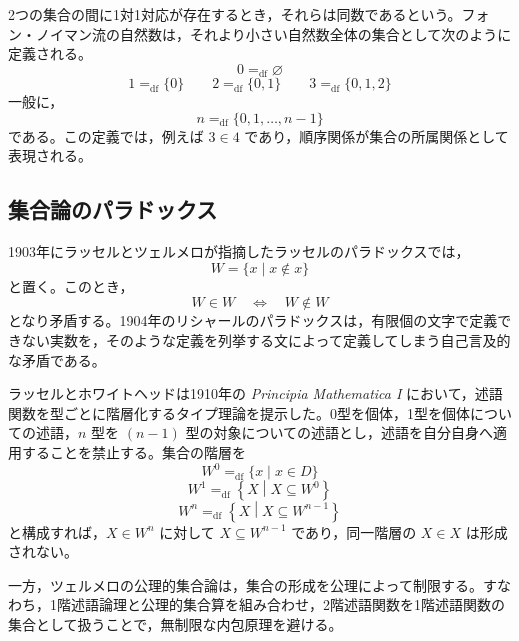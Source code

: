 \documentclass[../main.tex]{subfiles}
\begin{document}
2つの集合の間に1対1対応が存在するとき，それらは同数であるという。フォン・ノイマン流の自然数は，それより小さい自然数全体の集合として次のように定義される。
\[
  0 =_{\mathrm{df}} \varnothing
\]
\[
  1 =_{\mathrm{df}} \{0\}
  \qquad
  2 =_{\mathrm{df}} \{0,1\}
  \qquad
  3 =_{\mathrm{df}} \{0,1,2\}
\]
一般に，
\[
  n =_{\mathrm{df}} \{0,1,\ldots,n-1\}
\]
である。この定義では，例えば \(3\in 4\) であり，順序関係が集合の所属関係として表現される。

\subsection{集合論のパラドックス}

1903年にラッセルとツェルメロが指摘したラッセルのパラドックスでは，
\[
  W = \{x \mid x\notin x\}
\]
と置く。このとき，
\[
  W\in W
  \quad\Longleftrightarrow\quad
  W\notin W
\]
となり矛盾する。1904年のリシャールのパラドックスは，有限個の文字で定義できない実数を，そのような定義を列挙する文によって定義してしまう自己言及的な矛盾である。

ラッセルとホワイトヘッドは1910年の \emph{Principia Mathematica I} において，述語関数を型ごとに階層化するタイプ理論を提示した。0型を個体，1型を個体についての述語，\(n\) 型を \((n-1)\) 型の対象についての述語とし，述語を自分自身へ適用することを禁止する。集合の階層を
\[
  W^0 =_{\mathrm{df}} \{x \mid x\in D\}
\]
\[
  W^1 =_{\mathrm{df}}
  \left\{
    X \mathrel{}
    \middle|
    \mathrel{}
    X\subseteq W^0
  \right\}
\]
\[
  W^n =_{\mathrm{df}}
  \left\{
    X \mathrel{}
    \middle|
    \mathrel{}
    X\subseteq W^{n-1}
  \right\}
\]
と構成すれば，\(X\in W^n\) に対して \(X\subseteq W^{n-1}\) であり，同一階層の \(X\in X\) は形成されない。

一方，ツェルメロの公理的集合論は，集合の形成を公理によって制限する。すなわち，1階述語論理と公理的集合算を組み合わせ，2階述語関数を1階述語関数の集合として扱うことで，無制限な内包原理を避ける。
\end{document}

